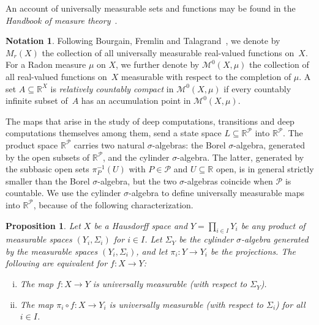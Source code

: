 \documentclass[psamsfonts]{amsart}
\newtheorem{prop}[thm]{Proposition}
\theoremstyle{definition}
\newtheorem{notn}[thm]{Notation}
\theoremstyle{remark}
\numberwithin{equation}{section}
\begin{document}
An account of universally measurable sets and functions may be found in the \emph{Handbook of measure theory}~\cite[Chapters 1 and 2]{Pap:2002}.

\begin{notn}
  Following Bourgain, Fremlin and Talagrand~\cite{BFT_1978_PCompactBaire}, we denote by $M_r(X)$ the collection of all universally measurable real-valued functions on~$X$.
  For a Radon measure $\mu$ on $X$, we further denote by $\mathscr{M}^0(X,\mu)$ the collection of all real-valued functions on~$X$ measurable with respect to the completion of $\mu$.
  A set $A\subseteq\mathbb{R}^X$ is \emph{relatively countably compact} in $\mathscr{M}^0(X,\mu)$ if every countably infinite subset of~$A$ has an accumulation point in $\mathscr{M}^0(X,\mu)$.
\end{notn}

The maps that arise in the study of deep computations, transitions and deep computations themselves among them, send a state space $L\subseteq \mathbb{R}^\mathcal{P}$ into $\mathbb{R}^\mathcal{P}$.
The product space $\mathbb{R}^\mathcal{P}$ carries two natural $\sigma$-algebras: the Borel $\sigma$-algebra, generated by the open subsets of $\mathbb{R}^\mathcal{P}$, and the cylinder $\sigma$-algebra.
The latter, generated by the subbasic open sets $\pi_P^{-1}(U)$ with $P\in\mathcal{P}$ and $U\subseteq \mathbb{R}$ open, is in general strictly smaller than the Borel $\sigma$-algebra, but the two $\sigma$-algebras coincide when $\mathcal{P}$ is countable.
We use the cylinder $\sigma$-algebra to define universally measurable maps into $\mathbb{R}^\mathcal{P}$, because of the following characterization.

\begin{prop}\label{prop:coordinated_univ_meas}
  Let $X$ be a Hausdorff space and $Y=\prod_{i\in I}Y_i$ be any product of measurable spaces $(Y_i,\Sigma_i)$ for $i\in I$.
  Let $\Sigma_Y$ be the cylinder $\sigma$-algebra generated by the measurable spaces $(Y_i,\Sigma_i)$, and let $\pi_i\colon Y\to Y_i$ be the projections.
  The following are equivalent for  $f:X\rightarrow Y$:
  \begin{enumerate}[(i)]
  \item
    The map $f:X\rightarrow Y$ is universally measurable (with respect to $\Sigma_Y$).
  \item
    The map $\pi_i\circ f:X\rightarrow Y_i$ is universally measurable (with respect to $\Sigma_i$) for all $i\in I$.
  \end{enumerate}
\end{prop}
\end{document}
